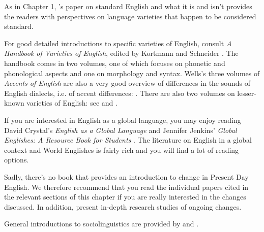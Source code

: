 \begin{furtherreading}
\label{PDE-reading}
As in Chapter 1, \citeauthor{Trudgill1999}'s \citeyearpar{Trudgill1999} paper on standard English and what it is and isn't provides the readers with perspectives on language varieties that happen to be considered standard.

For good detailed introductions to specific varieties of English, consult \textit{A Handbook of Varieties of English}, edited by Kortmann and Schneider \citeyearpar{KortmannSchneider2004}. The handbook comes in two volumes, one of which focuses on phonetic and phonological aspects and one on morphology and syntax. Wells's three volumes of \textit{Accents of English} are also a very good overview of differences in the sounds of English dialects, i.e. of accent differences: \citet{Wells1982a,Wells1982b,Wells1982c}. There are also two volumes on lesser-known varieties of English: see \citet{Schreieretal2010} and \citet{Williamsetal2015}.

If you are interested in English as a global language, you may enjoy reading David Crystal's \textit{English as a Global Language} \citeyearpar{Crystal2003b} and Jennifer Jenkins' \textit{Global Englishes: A Resource Book for Students} \citeyearpar{Jenkins2015}. The literature on English in a global context and World Englishes is fairly rich and you will find a lot of reading options.

Sadly, there's no book that provides an introduction to change in Present Day English. We therefore recommend that you read the individual papers cited in the relevant sections of this chapter if you are really interested in the changes discussed. In addition, \citet{LeechEtal2009} present in-depth research studies of ongoing changes.

General introductions to sociolinguistics are provided by \citet{MesthrieEtal2009} and \citet{Meyerhoff2019}.
\end{furtherreading}
